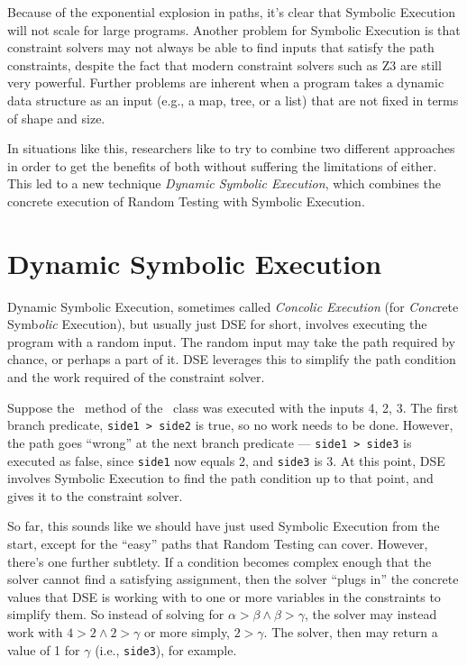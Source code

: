 Because of the exponential explosion in paths, it's clear that Symbolic
Execution will not scale for large programs. Another problem for Symbolic
Execution is that constraint solvers may not always be able to find inputs that
satisfy the path constraints, despite the fact that modern constraint solvers
such as Z3 are still very powerful. Further problems are inherent when a program
takes a dynamic data structure as an input (e.g., a map, tree, or a list) that
are not fixed in terms of shape and size. 

In situations like this, researchers like to try to combine two different
approaches in order to get the benefits of both without suffering the
limitations of either. This led to a new technique {\it Dynamic Symbolic
Execution}, which combines the concrete execution of Random Testing with
Symbolic Execution.

\section{Dynamic Symbolic Execution}

Dynamic Symbolic Execution, sometimes called {\it Concolic Execution} (for {\it
Conc}rete Symb{\it olic} Execution), but usually just DSE for short, involves
executing the program with a random input. The random input may take the path
required by chance, or perhaps a part of it. DSE leverages this to simplify the
path condition and the work required of the constraint solver. 

Suppose the \classifymethod~method of the \triangleclass~class was executed with
the inputs 4, 2, 3. The first branch predicate, {\tt side1 > side2} is true, so
no work needs to be done. However, the path goes ``wrong'' at the next branch
predicate --- {\tt side1 > side3} is executed as false, since {\tt side1} now
equals 2, and {\tt side3} is 3. At this point, DSE involves Symbolic Execution
to find the path condition up to that point, and gives it to the constraint
solver. 

So far, this sounds like we should have just used Symbolic Execution from the
start, except for the ``easy'' paths that Random Testing can cover. However,
there’s one further subtlety. If a condition becomes complex enough that the
solver cannot find a satisfying assignment, then the solver ``plugs in'' the
concrete values that DSE is working with to one or more variables in the
constraints to simplify them. So instead of solving for $\alpha > \beta \wedge
\beta > \gamma$, the solver may instead work with $4 > 2 \wedge 2 > \gamma$ or
more simply, $2 > \gamma$. The solver, then may return a value of 1 for $\gamma$
(i.e., {\tt side3}), for example.

